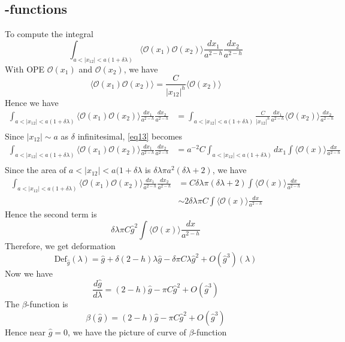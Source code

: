 \subsection{\beta-functions}
To compute the integral 
\[
\int_{a < |x_{12}| < a(1+\delta \lambda)} \langle \mathcal{O}(x_1) \mathcal{O}(x_2) \rangle \frac{d x_1}{a^{2-h}} \frac{d x_2}{a^{2-h}}
\]
With OPE $\mathcal{O}(x_1)$ and $\mathcal{O}(x_2)$, we have 
\begin{equation}
	\langle \mathcal{O}(x_1) \mathcal{O}(x_2) \rangle = \frac{C}{|x_{12}|^h} \langle\mathcal{O}(x_2)\rangle
\end{equation} 
Hence we have
\begin{equation}
\label{eq13}
	\begin{split}
	\int_{a < |x_{12} | < a(1+\delta\lambda)} \langle \mathcal{O}(x_1) \mathcal{O}(x_2) \rangle \frac{d x_1}{a^{2-h}} \frac{d x_2}{a^{2-h}} &= \int_{a < |x_{12} | < a(1+\delta\lambda)} \frac{C}{|x_{12}|^h} \frac{dx_1}{a^{2-h}} \langle \mathcal{O}(x_2) \rangle  \frac{dx_2}{a^{2-h}}\\
	&
	\end{split}
\end{equation}
Since $|x_{12}| \sim a$ as $\delta$ infinitesimal, \ref{eq13} becomes 
\begin{equation}
	\begin{split}
	\int_{a < |x_{12} | < a(1+\delta\lambda)} \langle \mathcal{O}(x_1) \mathcal{O}(x_2) \rangle \frac{d x_1}{a^{2-h}} \frac{d x_2}{a^{2-h}} & = a^{-2}C \int_{a < |x_{12} | < a(1+\delta\lambda)} dx_1 \int \langle \mathcal{O}(x) \rangle \frac{dx}{a^{2-h}}\\
	\end{split}
\end{equation}
Since the area of $a < |x_{12} | < a(1+\delta\lambda $ is $\delta \lambda \pi a^2 (\delta \lambda +2)$, we have
\begin{equation}
	\begin{split}
	\int_{a < |x_{12} | < a(1+\delta\lambda)} \langle \mathcal{O}(x_1) \mathcal{O}(x_2) \rangle \frac{d x_1}{a^{2-h}} \frac{d x_2}{a^{2-h}} & = C \delta \lambda \pi (\delta\lambda +2) \int \langle \mathcal{O}(x)\rangle \frac{dx}{a^{2-h}}\\
	& \sim 2 \delta \lambda \pi C \int \langle \mathcal{O}(x) \rangle \frac{dx}{a^{2-h}}
	\end{split}
\end{equation}
Hence the second term is 
\[
\delta \lambda \pi C \hat{g}^2  \int \langle \mathcal{O}(x) \rangle \frac{dx}{a^{2-h}}
\]
Therefore, we get deformation
\begin{equation}
	\text{Def}_{\hat{g}}(\lambda) = \hat{g} + \delta(2-h) \lambda \hat{g} - \delta \pi C \lambda \hat{g}^2 + O(\hat{g}^3)(\lambda)
\end{equation}
Now we have 
\begin{equation}
	\frac{d \hat{g}}{d\lambda} = (2-h) \hat{g} - \pi C \hat{g}^2 + O(\hat{g}^3)
\end{equation}
The $\beta$-function is 
\[
\beta(\hat{g}) = (2-h) \hat{g} - \pi C \hat{g}^2 + O(\hat{g}^3)
\]
Hence near $\hat{g}=0$, we have the picture of curve of $\beta$-function

